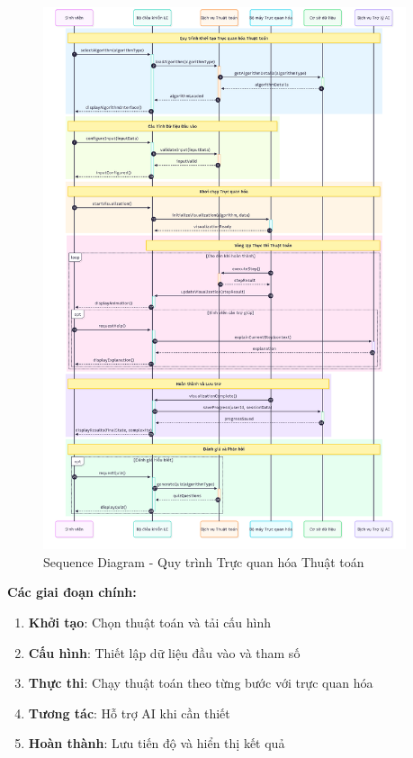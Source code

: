 \begin{figure}[H]
\centering
\includegraphics[width=0.95\textwidth]{images/sequence-algorithm-visualization.png}
\caption{Sequence Diagram - Quy trình Trực quan hóa Thuật toán}
\label{fig:sequence-algorithm-visualization}
\end{figure}

\textbf{Các giai đoạn chính:}
\begin{enumerate}
    \item \textbf{Khởi tạo}: Chọn thuật toán và tải cấu hình
    \item \textbf{Cấu hình}: Thiết lập dữ liệu đầu vào và tham số
    \item \textbf{Thực thi}: Chạy thuật toán theo từng bước với trực quan hóa
    \item \textbf{Tương tác}: Hỗ trợ AI khi cần thiết
    \item \textbf{Hoàn thành}: Lưu tiến độ và hiển thị kết quả
\end{enumerate}


